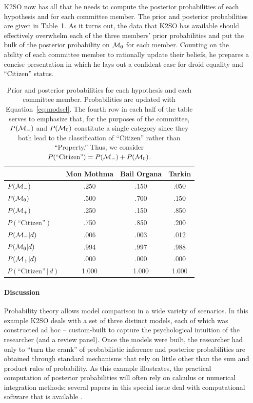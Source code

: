 K2SO now has all that he needs to compute the posterior probabilities of each hypothesis and for each committee member. The prior and posterior probabilities are given in Table~\ref{tab:elf}. As it turns out, the data that K2SO has available should effectively overwhelm each of the three members' prior probabilities and put the bulk of the posterior probability on ${\cal M}_0$ for each member. Counting on the ability of each committee member to rationally update their beliefs, he prepares a concise presentation in which he lays out a confident case for droid equality and ``Citizen'' status.

\begin{table}[tb]\centering
\caption{Prior and posterior probabilities for each hypothesis and each committee member. Probabilities are updated with Equation~\ref{eq:modsel}. The fourth row in each half of the table serves to emphasize that, for the purposes of the committee, $P({\cal M}_-)$ and $P({\cal M}_0)$ constitute a single category since they both lead to the classification of ``Citizen'' rather than ``Property.'' Thus, we consider $P(\mbox{``Citizen''}) = P(  {\cal M}_-) + P(  {\cal M}_0)$.}\label{tab:elf}
\begin{tabular}{lccc}
             & Mon Mothma& Bail Organa & Tarkin \\ \hline
 $P(  {\cal M}_-)$ &   \p.250  & \p.150  & \p.050  \\
 $P(  {\cal M}_0)$ &   \p.500  & \p.700  & \p.150  \\
 $P(  {\cal M}_+)$ &   \p.250  & \p.150  & \p.850  \\
 $P(\mbox{``Citizen''})$ & \p.750 & \p.850 & \p.200 \\
 \hline
 $P(  {\cal M}_-|d)$ &   \p.006  & \p.003  & \p.012 \\
 $P(  {\cal M}_0|d)$ &   \p.994  & \p.997  & \p.988 \\
 $P(  {\cal M}_+|d)$ &   \p.000  & \p.000  & \p.000 \\  $P(\mbox{``Citizen''}\,|\,d)$ & 1.000 & 1.000 & 1.000 \\
 \hline
\end{tabular}
\end{table}

\paragraph{Discussion} Probability theory allows model comparison in a wide variety of scenarios. In this example K2SO deals with a set of three distinct models, each of which was constructed ad hoc -- custom-built to capture the psychological intuition of the researcher (and a review panel).  Once the models were built, the researcher had only to ``turn the crank'' of probabilistic inference and posterior probabilities are obtained through standard mechanisms that rely on little other than the sum and product rules of probability.  As this example illustrates, the practical computation of posterior probabilities will often rely on calculus or numerical integration methods; several papers in this special issue deal with computational software that is available \cite{LoveSI,MatzkeSI,vanravenzwaaijSI,WagenmakersSI}.

